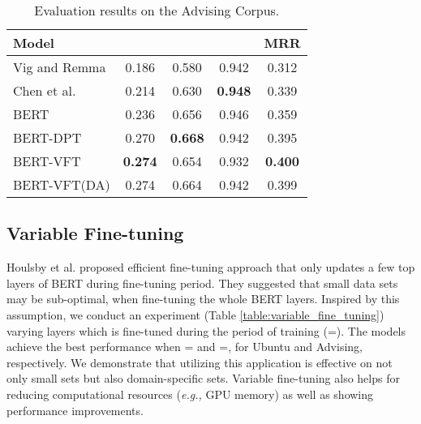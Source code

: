 \documentclass[a4paper]{article}
\begin{document}
\begin{table}[h]\centering
\begin{adjustbox}{width=0.45\textwidth}
\centering
\renewcommand{\arraystretch}{1.2}\begin{large}
\begin{tabular}{l|cccc}
\hline

\textbf{Model}   &     &    &   & MRR  \\
\hline
Vig and Remma \cite{vig2019comparison}     & 0.186    & 0.580  & 0.942 & 0.312 \\
Chen et al. \cite{chen2019sequential}     & 0.214    & 0.630  & \textbf{0.948} & 0.339 \\
\hline
\hline
BERT   & 0.236  & 0.656    & 0.946  & 0.359 \\ 
BERT-DPT  & 0.270  & \textbf{0.668}    & 0.942  & 0.395\\
BERT-VFT & \textbf{0.274}  & 0.654  & 0.932 & \textbf{0.400}\\
BERT-VFT(DA) & 0.274  & 0.664 & 0.942 & 0.399 \\

\hline

\end{tabular}
\end{large}
\end{adjustbox}
\caption{Evaluation results on the Advising Corpus.}
\label{table:evaluation_results_advising}
\vspace{-0.7cm}
\end{table}

\subsection{Variable Fine-tuning}
Houlsby et al. \cite{houlsby2019parameter} proposed efficient fine-tuning approach that only updates a few top layers of BERT during fine-tuning period. They suggested that small data sets may be sub-optimal, when fine-tuning the whole BERT layers. Inspired by this assumption, we conduct an experiment (Table \ref{table:variable_fine_tuning}) varying  layers which is fine-tuned during the period of training (=). The models achieve the best performance when = and =, for Ubuntu and Advising, respectively. We demonstrate that utilizing this application is effective on not only small sets but also domain-specific sets. Variable fine-tuning also helps for reducing computational resources ({\em{e.g.,}} GPU memory) as well as showing performance improvements.\\
\end{document}
